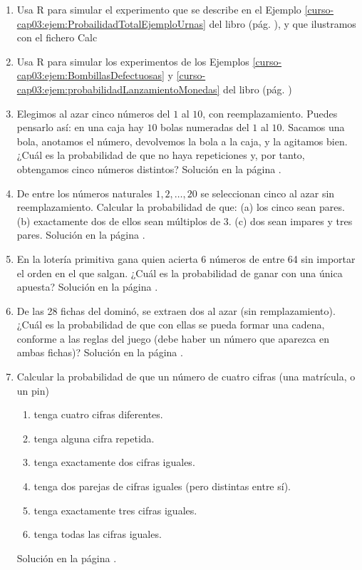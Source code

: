 \documentclass[10pt,a4paper]{article}\usepackage[]{graphicx}\usepackage[]{color}
\begin{document}
\begin{enumerate}
\item  Usa R para simular el experimento que se describe en el Ejemplo \ref{curso-cap03:ejem:ProbailidadTotalEjemploUrnas} del libro (pág. \pageref{curso-cap03:ejem:ProbailidadTotalEjemploUrnas}), y que ilustramos con el fichero  Calc
\begin{center}
\end{center}
\item Usa R para simular los experimentos de los Ejemplos \ref{curso-cap03:ejem:BombillasDefectuosas} y \ref{curso-cap03:ejem:probabilidadLanzamientoMonedas} del libro (pág. \pageref{curso-cap03:ejem:BombillasDefectuosas})


\item  \label{tut03:ejercicio34} Elegimos al azar cinco números del $1$ al $10$, con reemplazamiento. Puedes pensarlo así: en una caja hay $10$ bolas numeradas del $1$ al $10$. Sacamos una bola, anotamos el número, devolvemos la bola a la caja, y la agitamos bien. ¿Cuál es la probabilidad de que no haya repeticiones y, por tanto, obtengamos cinco números distintos?
Solución en la página \pageref{tut03:ejercicio34:sol}. 


\item  \label{tut03:ejercicio35} De entre los números naturales $1,2,\ldots,20$ se seleccionan cinco al azar sin reemplazamiento. Calcular la probabilidad de que: (a) los cinco sean pares. (b) exactamente dos de ellos sean múltiplos de 3. (c) dos sean impares y tres pares. 
Solución en la página \pageref{tut03:ejercicio35:sol}. 

   \item \label{tut03:ejercicio36}  En la lotería primitiva gana quien acierta 6 números de entre 64 sin importar el orden en el que salgan. ¿Cuál es la probabilidad de ganar con una única apuesta? 
Solución en la página \pageref{tut03:ejercicio36:sol}. 

\item  \label{tut03:ejercicio37} De las 28 fichas del dominó, se extraen dos al azar (sin remplazamiento). ¿Cuál es la probabilidad de que con ellas se pueda formar una cadena, conforme a las reglas del juego (debe haber un número que aparezca en ambas fichas)?
Solución en la página \pageref{tut03:ejercicio37:sol}. 


\item  \label{tut03:ejercicio38} Calcular la probabilidad de que un número de cuatro cifras (una matrícula, o un pin)
\begin{enumerate}
\item tenga cuatro cifras diferentes.
\item tenga alguna cifra repetida.
\item tenga exactamente dos cifras iguales.
\item tenga dos parejas de cifras iguales (pero distintas entre sí).
\item tenga exactamente tres cifras iguales.
\item tenga todas las cifras iguales.
\end{enumerate}
Solución en la página \pageref{tut03:ejercicio38:sol}. 


\end{enumerate}
\end{document}
